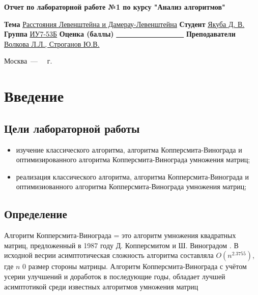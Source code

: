 \documentclass[12pt]{report}
\begin{document}
\begin{titlepage}
	
	\begin{center}
		\Large\textbf{Отчет по лабораторной работе №1 по курсу "Анализ алгоритмов"}\newline
	\end{center}
	
	\noindent\textbf{Тема} \underline{Расстояния Левенштейна и Дамерау-Левенштейна}\newline\newline\newline
	\noindent\textbf{Студент} \underline{Якуба Д. В.}\newline\newline
	\noindent\textbf{Группа} \underline{ИУ7-53Б}\newline\newline
	\noindent\textbf{Оценка (баллы)} \underline{~~~~~~~~~~~~~~~~~~~}\newline\newline
	\noindent\textbf{Преподаватели} \underline{Волкова Л.Л., Строганов Ю.В.}\newline
	
	\begin{center}
		\vfill
		Москва~---~\the\year
		~г.
	\end{center}
\end{titlepage}

\tableofcontents

\newpage
\chapter*{Введение}
\section*{Цели лабораторной работы}
\begin{itemize}
\item изучение классического алгоритма, алгоритма Копперсмита-Винограда и оптимизированного алгоритма Копперсмита-Винограда умножения матриц;
\item реализация классического алгоритма, алгоритма Копперсмита-Винограда и оптимизиованного алгоритма Копперсмита-Винограда умножения матриц;
\end{itemize}
\section*{Определение}
Алгоритм Копперсмита-Винограда = это алгоритм умножения квадратных матриц, предложенный в 1987 году Д. Копперсмитом и Ш. Виноградом \cite{Coppersmith}. В исходной весрии асимптотическая сложность алгоритма составляла $O(n^{2.3755})$, где $n$ 0 размер стороны матрицы. Алгоритм Копперсмита-Винограда с учётом усерии улучшений и доработок в последующие годы, обладает лучшей асимптотикой среди известных алгоритмов умножения матриц
\end{document}
